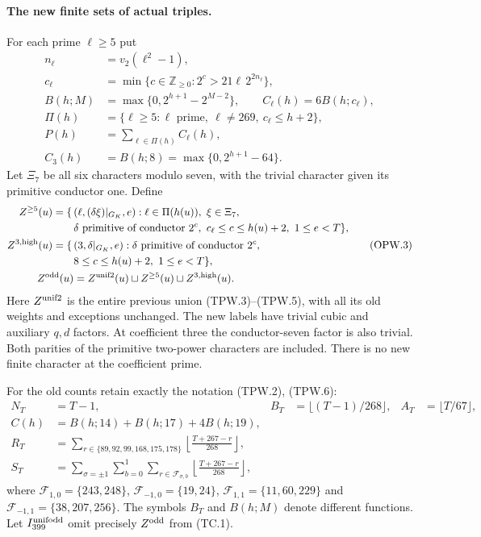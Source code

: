 \paragraph{The new finite sets of actual triples.}
For each prime $\ell\geq5$ put
\[
 \begin{aligned}
 n_\ell&=v_2(\ell^2-1),\\
 c_\ell&=\min\{c\in\mathbb Z_{\geq0}:2^c>21\ell\,2^{2n_\ell}\},\\
 B(h;M)&=\max\{0,2^{h+1}-2^{M-2}\},
             \qquad C_\ell(h)=6B(h;c_\ell),\\
 \Pi(h)&=\{\ell\geq5:\ell\text{ prime},\ \ell\ne269,
                                      \ c_\ell\leq h+2\},\\
 P(h)&=\sum_{\ell\in\Pi(h)}C_\ell(h),\\
 C_3(h)&=B(h;8)=\max\{0,2^{h+1}-64\}.
 \end{aligned}
 \tag{OPW.2}
\]
Let $\Xi_7$ be all six characters modulo seven, with the trivial
character given its primitive conductor one.  Define
\[
 \begin{aligned}
 Z^{\geq5}(u)=\{\,&(\ell,(\delta\xi)|_{G_K},e):
       \ell\in\Pi(h(u)),\ \xi\in\Xi_7,\\
       &\delta\text{ primitive of conductor }2^c,
       \ c_\ell\leq c\leq h(u)+2,\ 1\leq e<T\},\\
 Z^{3,\mathrm{high}}(u)=\{\,&(3,\delta|_{G_K},e):
       \delta\text{ primitive of conductor }2^c,\\
       &8\leq c\leq h(u)+2,\ 1\leq e<T\},\\
 Z^{\mathrm{odd}}(u)&=Z^{\rm unif2}(u)
                 \sqcup Z^{\geq5}(u)\sqcup Z^{3,\mathrm{high}}(u).
 \end{aligned}
 \tag{OPW.3}
\]
Here $Z^{\rm unif2}$ is the entire previous union (TPW.3)--(TPW.5),
with all its old weights and exceptions unchanged.
The new labels have trivial cubic and auxiliary $q,d$ factors.
At coefficient three the conductor-seven factor is also trivial.
Both parities of the primitive two-power characters are included.
There is no new finite character at the coefficient prime.

For the old counts retain exactly the notation (TPW.2), (TPW.6):
\[
 \begin{aligned}
 N_T&=T-1,& B_T&=\lfloor(T-1)/268\rfloor,& A_T&=\lfloor T/67\rfloor,\\
 C(h)&=B(h;14)+B(h;17)+4B(h;19),\\
 R_T&=\sum_{r\in\{89,92,99,168,175,178\}}
                      \left\lfloor\frac{T+267-r}{268}\right\rfloor,\\
 S_T&=\sum_{\sigma=\pm1}\sum_{b=0}^1
       \sum_{r\in\mathcal F_{\sigma,b}}
                      \left\lfloor\frac{T+267-r}{268}\right\rfloor,
 \end{aligned}
 \tag{OPW.4}
\]
where $\mathcal F_{1,0}=\{243,248\}$,
$\mathcal F_{-1,0}=\{19,24\}$,
$\mathcal F_{1,1}=\{11,60,229\}$ and
$\mathcal F_{-1,1}=\{38,207,256\}$.
The symbols $B_T$ and $B(h;M)$ denote different functions.
Let $I_{399}^{\rm unifodd}$ omit precisely $Z^{\rm odd}$ from (TC.1).

